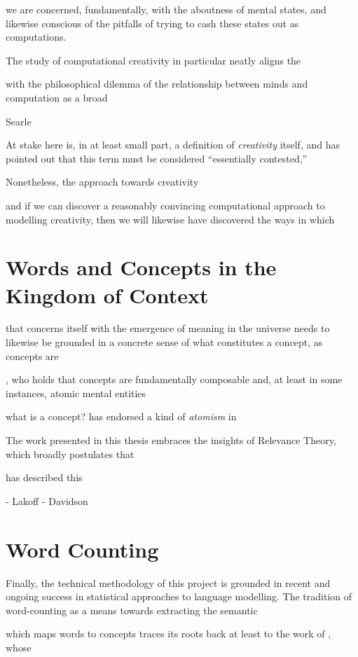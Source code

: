 we are concerned, fundamentally, with the aboutness of mental states, and likewise conscious of the pitfalls of trying to cash these states out as computations.

The study of computational creativity in particular neatly aligns the 

with the philosophical dilemma of the relationship between minds and computation as a broad

Searle

At stake here is, in at least small part, a definition of \emph{creativity} itself, and \cite{Colton} has pointed out that this term must be considered ``essentially contested,''

Nonetheless, the approach towards creativity 

and if we can discover a reasonably convincing computational approach to modelling creativity, then we will likewise have discovered the ways in which 

\section{Words and Concepts in the Kingdom of Context}
that concerns itself with the emergence of meaning in the universe needs to likewise be grounded in a concrete sense of what constitutes a concept, as concepts are

\cite{Fodor}, who holds that concepts are fundamentally composable and, at least in some instances, atomic mental entities

what is a concept?  \cite{Fodor} has endorsed a kind of \emph{atomism} in 

\citep[cf][for a case against conceptual schema in general]{Davidson}

The work presented in this thesis embraces the insights of Relevance Theory, which broadly postulates that 

\cite{Carston} has described this 

- Lakoff
- Davidson



\section{Word Counting}
Finally, the technical methodology of this project is grounded in recent and ongoing success in statistical approaches to language modelling.  The tradition of word-counting as a means towards extracting the semantic 

which maps words to concepts traces its roots back at least to the work of \cite{Markov}, whose

